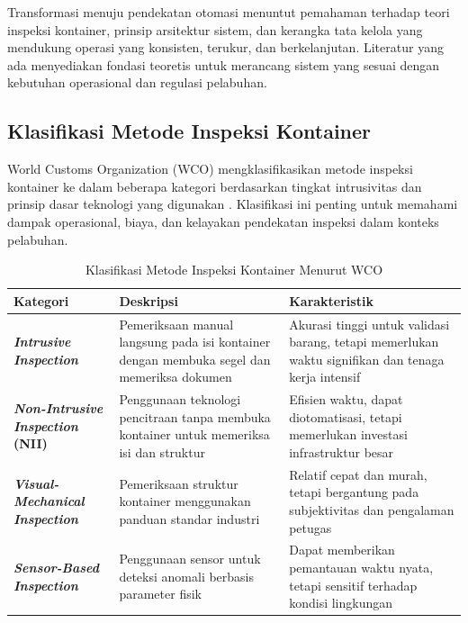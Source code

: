 Transformasi menuju pendekatan otomasi menuntut pemahaman terhadap teori
inspeksi kontainer, prinsip arsitektur sistem, dan kerangka tata kelola yang
mendukung operasi yang konsisten, terukur, dan berkelanjutan. Literatur yang ada
menyediakan fondasi teoretis untuk merancang sistem yang sesuai dengan kebutuhan
operasional dan regulasi pelabuhan.

\subsection{Klasifikasi Metode Inspeksi Kontainer}

World Customs Organization (WCO) mengklasifikasikan metode inspeksi kontainer ke dalam beberapa kategori berdasarkan tingkat intrusivitas dan prinsip dasar teknologi yang digunakan \autocite{wco2020}. Klasifikasi ini penting untuk memahami dampak operasional, biaya, dan kelayakan pendekatan inspeksi dalam konteks pelabuhan.

\begin{table}[ht]
  \centering
  \caption{Klasifikasi Metode Inspeksi Kontainer Menurut WCO}
  \label{tbl:inspeksi_klasifikasi}
  \begin{tabular}{p{} p{} p{}}
    \toprule
    \textbf{Kategori} & \textbf{Deskripsi} & \textbf{Karakteristik} \\
    \midrule
    \textbf{\textit{Intrusive Inspection}} & Pemeriksaan manual langsung pada isi kontainer dengan membuka segel dan memeriksa dokumen & Akurasi tinggi untuk validasi barang, tetapi memerlukan waktu signifikan dan tenaga kerja intensif \\
    \textbf{\textit{Non-Intrusive Inspection} (NII)} & Penggunaan teknologi pencitraan tanpa membuka kontainer untuk memeriksa isi dan struktur & Efisien waktu, dapat diotomatisasi, tetapi memerlukan investasi infrastruktur besar \\
    \textbf{\textit{Visual-Mechanical Inspection}} & Pemeriksaan struktur kontainer menggunakan panduan standar industri & Relatif cepat dan murah, tetapi bergantung pada subjektivitas dan pengalaman petugas \\
    \textbf{\textit{Sensor-Based Inspection}} & Penggunaan sensor untuk deteksi anomali berbasis parameter fisik & Dapat memberikan pemantauan waktu nyata, tetapi sensitif terhadap kondisi lingkungan \\
    \bottomrule
  \end{tabular}
\end{table}

